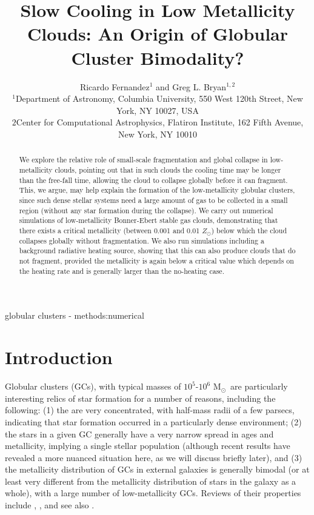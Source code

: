 \documentclass[useAMS,usenatbib]{mn2e}
\title{Slow Cooling in Low Metallicity Clouds: An Origin of Globular Cluster Bimodality?}
\author[R. Fernandez et al.]{Ricardo Fernandez$^{1}$ and Greg L. Bryan$^{1,2}$\\
$^{1}$Department of Astronomy, Columbia University, 550 West 120th Street, New York, NY 10027, USA \\
${2}$Center for Computational Astrophysics, Flatiron Institute, 162 Fifth Avenue, New York, NY 10010}
\newcommand{\msun}{{M$_\odot$}}
\begin{document}
\date{}


\maketitle


\begin{abstract}

We explore the relative role of small-scale fragmentation and global collapse in low-metallicity clouds, pointing out that in such clouds the cooling time may be longer than the free-fall time, allowing the cloud to collapse globally before it can fragment.  This, we argue, may help explain the formation of the low-metallicity globular clusters, since such dense stellar systems need a large amount of gas to be collected in a small region (without any star formation during the collapse).  We carry out numerical simulations of low-metallicity Bonner-Ebert stable gas clouds, demonstrating that there exists a critical metallicity (between 0.001 and 0.01 $Z_\odot$) below which the cloud collapses globally without fragmentation.  We also run simulations including a background radiative heating source, showing that this can also produce clouds that do not fragment, provided the metallicity is again below a critical value which depends on the heating rate and is generally larger than the no-heating case.

\end{abstract}

\begin{keywords}
globular clusters - methods:numerical
\end{keywords}

%
\section{Introduction}

Globular clusters (GCs), with typical masses of $10^5$-$10^6$ \msun\ are particularly interesting relics of star formation for a number of reasons, including the following: (1) the are very concentrated, with half-mass radii of a few parsecs, indicating that star formation occurred in a particularly dense environment; (2) the stars in a given GC generally have a very narrow spread in ages and metallicity, implying a single stellar population (although recent results have revealed a more nuanced situation here, as we will discuss briefly later), and (3) the metallicity distribution of GCs in external galaxies is generally bimodal (or at least very different from the metallicity distribution of stars in the galaxy as a whole), with a large number of low-metallicity GCs.  Reviews of their properties include \citet{Brodie2006}, \citet{Renzini2008, Renzini2013}, and see also \cite{zwart2010}.
\end{document}
